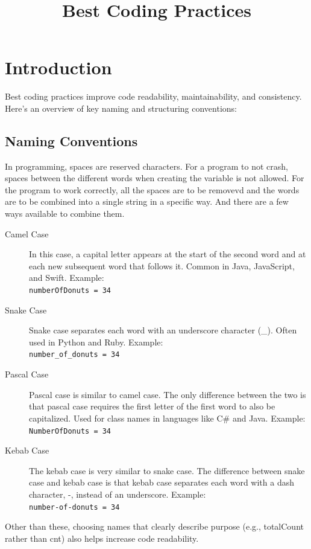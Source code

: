 \documentclass[12pt]{article}
\title{Best Coding Practices}
\author{}
\date{}
\begin{document}


\maketitle
\section*{Introduction}
Best coding practices improve code readability, maintainability, and consistency. Here's an overview of key naming and structuring conventions:

\subsection*{Naming Conventions}
In programming, spaces are reserved characters. For a program to not crash, spaces between the different words when creating the variable is not allowed. For the program to work correctly, all the spaces are to be removevd and the words are to be combined into a single string in a specific way. And there are a few ways available to combine them.

\begin{description}
    \item[Camel Case] In this case, a capital letter appears at the start of the second word and at each new subsequent word that follows it. Common in Java, JavaScript, and Swift. Example: \\ \verb|numberOfDonuts = 34|
    \item[Snake Case] Snake case separates each word with an underscore character (\_). Often used in Python and Ruby. Example:\\ \verb|number_of_donuts = 34|
    \item[Pascal Case] Pascal case is similar to camel case. The only difference between the two is that pascal case requires the first letter of the first word to also be capitalized. Used for class names in languages like C\# and Java. Example:\\ \verb|NumberOfDonuts = 34|
    \item[Kebab Case] The kebab case is very similar to snake case. The difference between snake case and kebab case is that kebab case separates each word with a dash character, -, instead of an underscore. Example:\\ \verb|number-of-donuts = 34|
\end{description}

Other than these, choosing names that clearly describe purpose (e.g., totalCount rather than cnt) also helps increase code readability.
\end{document}
